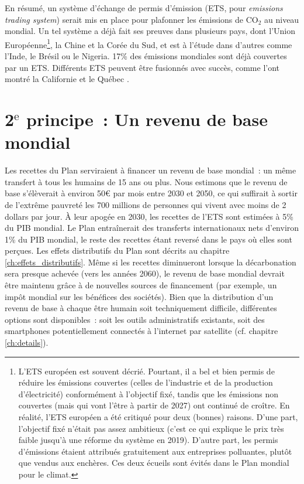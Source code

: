 \documentclass[a5paper,french]{memoir}
\begin{document}
En résumé, un système d'échange de permis d'émission (ETS, pour \textit{emissions trading system}) serait mis en place pour plafonner les émissions de CO$_\text{2}$ au niveau mondial. 
Un tel système a déjà fait ses preuves dans plusieurs pays, dont l'Union Européenne\footnote{L'ETS européen est souvent décrié. Pourtant, il a bel et bien permis de réduire les émissions couvertes (celles de l'industrie et de la production d'électricité) conformément à l'objectif fixé, tandis que les émissions non couvertes (mais qui vont l'être à partir de 2027) ont continué de croître. En réalité, l'ETS européen a été critiqué pour deux (bonnes) raisons. D'une part, l'objectif fixé n'était pas assez ambitieux (c'est ce qui explique le prix très faible jusqu'à une réforme du système en 2019). D'autre part, les permis d'émissions étaient attribués gratuitement aux entreprises polluantes, plutôt que vendus aux enchères. Ces deux écueils sont évités dans le Plan mondial pour le climat.}, la Chine et la Corée du Sud, et est à l'étude dans d'autres comme l'Inde, le Brésil ou le Nigeria. 17\% des émissions mondiales sont déjà couvertes par un ETS. Différents ETS peuvent être fusionnés avec succès, comme l'ont montré la Californie et le Québec \citep{icap_emissions_2023}. 

\section{2$^\text{e}$ principe~: Un revenu de base mondial}

Les recettes du Plan serviraient à financer un revenu de base mondial~: un même transfert à tous les humains de 15 ans ou plus. Nous estimons que le revenu de base s'élèverait à environ 50\euro{} par mois entre 2030 et 2050, ce qui suffirait à sortir de l'extrême pauvreté les 700 millions de personnes qui vivent avec moins de 2 dollars par jour. À leur apogée en 2030, les recettes de l'ETS sont estimées à 5\% du PIB mondial. Le Plan entraînerait des transferts internationaux nets d'environ 1\% %
du PIB mondial, le reste des recettes étant reversé dans le pays où elles sont perçues. Les effets distributifs du Plan sont décrits au chapitre \ref{ch:effets_distributifs}. %
Même si les recettes diminueront lorsque la décarbonation sera presque achevée (vers les années 2060), le revenu de base mondial devrait être maintenu grâce à de nouvelles sources de financement (par exemple, un impôt mondial sur les bénéfices des sociétés). Bien que la distribution d'un revenu de base à chaque être humain soit techniquement difficile, différentes options sont disponibles~: soit les outils administratifs existants, soit des smartphones potentiellement connectés à l'internet par satellite (cf. chapitre \ref{ch:details}).
\end{document}
